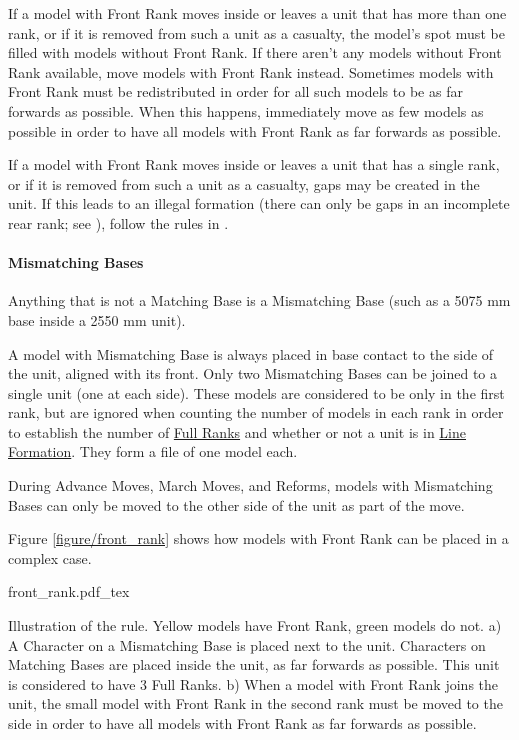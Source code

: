 If a model with Front Rank moves inside or leaves a unit that has more than one rank, or if it is removed from such a unit as a casualty,  the model's spot must be filled with models without Front Rank. If there aren't any models without Front Rank available, move models with Front Rank instead. Sometimes models with Front Rank must be redistributed in order for all such models to be as far forwards as possible. When this happens, immediately move as few models as possible in order to have all models with Front Rank as far forwards as possible.

If a model with Front Rank moves inside or leaves a unit that has a single rank, or if it is removed from such a unit as a casualty, gaps may be created in the unit. If this leads to an illegal formation (there can only be gaps in an incomplete rear rank; see ), follow the rules in .

\columnbreak

\paragraph{Mismatching Bases}
\label{mismatching_bases}

Anything that is not a Matching Base is a Mismatching Base (such as a \num{50}\timess{}\num{75} \si{\milli\meter} base inside a \num{25}\timess{}\num{50} \si{\milli\meter} unit).

A model with Mismatching Base is always placed in base contact to the side of the unit, aligned with its front. Only two Mismatching Bases can be joined to a single unit (one at each side). These models are considered to be only in the first rank, but are ignored when counting the number of models in each rank in order to establish the number of \hyperref[full_ranks]{Full Ranks} and whether or not a unit is in \hyperref[line_formation]{Line Formation}. They form a file of one model each.

During Advance Moves, March Moves, and Reforms, models with Mismatching Bases can only be moved to the other side of the unit as part of the move.

Figure \ref{figure/front_rank} shows how models with Front Rank can be placed in a complex case.

\newcommand{\figFRA}{a)}
\newcommand{\figFRB}{b)}

\begin{Figure}
	\Fanchor
	\centering
	\def\svgwidth{\columnwidth}
	{front_rank.pdf_tex}
	\caption{Illustration of the \frontrank{} rule.\captionposttitle
		Yellow models have Front Rank, green models do not.\captionpar
		a) A Character on a Mismatching Base is placed next to the unit. Characters on Matching Bases are placed inside the unit, as far forwards as possible. This unit is considered to have 3 Full Ranks.\captionpar
		b) When a model with Front Rank joins the unit, the small model with Front Rank in the second rank must be moved to the side in order to have all models with Front Rank as far forwards as possible.
	}
	\label{figure/front_rank}
\end{Figure}

